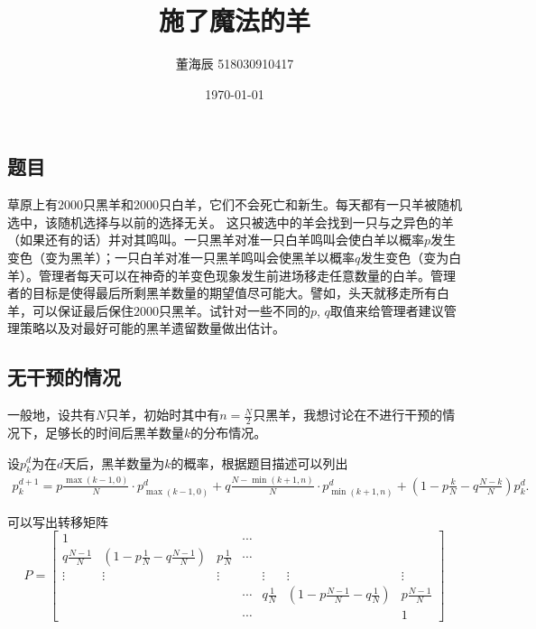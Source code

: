 
% 

\title{施了魔法的羊}
\date{\today}
\author{董海辰 518030910417}


\maketitle

\subsection*{题目}

草原上有$2000$只黑羊和$2000$只白羊，它们不会死亡和新生。每天都有一只羊被随机选中，该随机选择与以前的选择无关。 这只被选中的羊会找到一只与之异色的羊（如果还有的话）并对其鸣叫。一只黑羊对准一只白羊鸣叫会使白羊以概率$p$发生变色（变为黑羊）；一只白羊对准一只黑羊鸣叫会使黑羊以概率$q$发生变色（变为白羊）。管理者每天可以在神奇的羊变色现象发生前进场移走任意数量的白羊。管理者的目标是使得最后所剩黑羊数量的期望值尽可能大。譬如，头天就移走所有白羊，可以保证最后保住$2000$只黑羊。试针对一些不同的$p$, $q$取值来给管理者建议管理策略以及对最好可能的黑羊遗留数量做出估计。

\subsection*{无干预的情况}

一般地，设共有$N$只羊，初始时其中有$n=\frac{N}{2}$只黑羊，我想讨论在不进行干预的情况下，足够长的时间后黑羊数量$k$的分布情况。

设$p_k^d$为在$d$天后，黑羊数量为$k$的概率，根据题目描述可以列出
\begin{align*}
    p_k^{d+1} = p \frac{\max(k-1, 0)}{N} \cdot p_{\max(k-1, 0)}^d + q \frac{N-\min(k+1,n)}{N} \cdot p_{\min(k+1,n)}^d + (1-p \frac{k}{N} - q \frac{N-k}{N})p_k^d
.\end{align*}

可以写出转移矩阵
$$P = \begin{bmatrix}
    1 & & & \cdots & & & \\
    q \frac{N-1}{N} & (1 - p \frac{1}{N} - q \frac{N-1}{N}) & p \frac{1}{N} & \cdots & & & \\
    \vdots & \vdots & \vdots & & \vdots & \vdots & \vdots\\
           & & &\cdots  & q \frac{1}{N} & (1 - p \frac{N-1}{N} - q \frac{1}{N}) & p \frac{N-1}{N} \\
           & & & \cdots & & & 1
\end{bmatrix}$$

